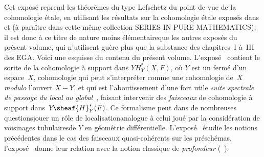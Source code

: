 Cet expos\'e reprend les th\'eor\`emes du type Lefschetz du point de vue de la cohomologie \'etale, en utilisant les r\'esultats sur la cohomologie \'etale expos\'es dans  et  (\`a para\^itre dans cette m\^eme collection SERIES IN PURE MATHEMATICS); il est donc \`a ce titre de nature moins \og \'el\'ementaire\fg que les autres expos\'es du pr\'esent volume, qui n'utilisent gu\`ere plus que la substance des chapitres~I \`a~III des EGA. Voici une esquisse du contenu du pr\'esent volume. L'expos\'e~ contient le sorite de la \og cohomologie \`a support dans $Y$\fg $H^*_Y(X, F)$, o\`u $Y$ est un ferm\'e d'un espace~$X$, cohomologie qui peut s'interpr\'eter comme une cohomologie de~$X$ \emph{modulo} l'ouvert $X-Y$, et qui est l'aboutissement d'une fort utile \og \emph{suite spectrale de passage du local au global}\fg {}~, faisant intervenir des \emph{faisceaux} de cohomologie \og \`a support dans~$Y$\fg $\sheaf{H}^*_Y(F)$. Ce formalisme peut dans de nombreuses questions\pageoriginale jouer un r\^{o}le de \og localisation\fg analogue \`a celui jou\'e par la consid\'eration de voisinages \og tubulaires\fg de $Y$ en g\'eom\'etrie diff\'erentielle. L'expos\'e~ \'etudie les notions pr\'ec\'edentes dans le cas des faisceaux quasi-coh\'erents sur les pr\'esch\'emas, l'expos\'e~ donne leur relation avec la notion classique de \emph{profondeur} (~).

